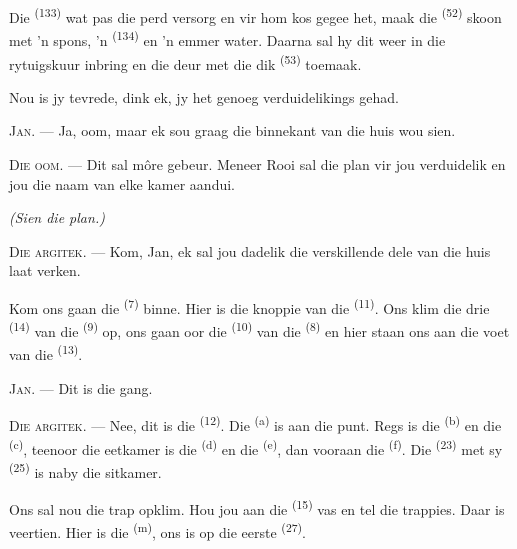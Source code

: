 Die  \textsuperscript{(133)} wat pas die perd versorg en vir hom kos
gegee het, maak die  \textsuperscript{(52)} skoon met 'n spons, 'n
 \textsuperscript{(134)} en 'n emmer water. Daarna sal hy dit weer in
die rytuigskuur inbring en die deur met die dik  \textsuperscript{(53)}
toemaak.

Nou is jy tevrede, dink ek, jy het genoeg verduidelikings gehad.

\textsc{Jan}. --- Ja, oom, maar ek sou graag die binnekant van die huis wou sien.

\textsc{Die oom}. --- Dit sal môre gebeur. Meneer Rooi sal die plan vir jou verduidelik
en jou die naam van elke kamer aandui.

\VUsaut{3.0mm}
\VUsaut{2.4mm}

{\centering\textit{(Sien die plan.)}\par}
\VUsaut{2.4mm}

\textsc{Die argitek}. --- Kom, Jan, ek sal jou dadelik die verskillende dele van die
huis laat verken.

Kom ons gaan die  \textsuperscript{(7)} binne. Hier is die
knoppie van die  \textsuperscript{(11)}. Ons klim die drie
 \textsuperscript{(14)} van die  \textsuperscript{(9)}
op, ons gaan oor die  \textsuperscript{(10)} van die
 \textsuperscript{(8)} en hier staan ons aan die voet van die
 \textsuperscript{(13)}.

\textsc{Jan}. --- Dit is die gang.

\textsc{Die argitek}. --- Nee, dit is die  \textsuperscript{(12)}.
Die  \textsuperscript{(a)} is aan die punt. Regs is die 
\textsuperscript{(b)} en die  \textsuperscript{(c)}, teenoor die
eetkamer is die  \textsuperscript{(d)} en die 
\textsuperscript{(e)}, dan vooraan die  \textsuperscript{(f)}. Die
 \textsuperscript{(23)} met sy  \textsuperscript{(25)}
is naby die sitkamer.

Ons sal nou die trap opklim. Hou jou aan die  \textsuperscript{(15)}
vas en tel die trappies. Daar is veertien. Hier is die 
\textsuperscript{(m)}, ons is op die eerste  \textsuperscript{(27)}.

